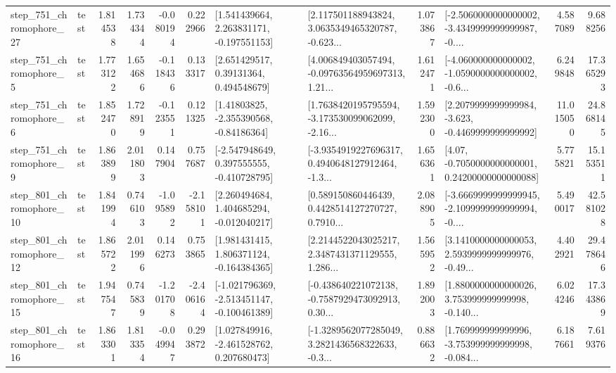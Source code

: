 \begin{tabular}{llrrrrllrlrr}
  step\_751\_chromophore\_27 &      test &      1.814538 &    1.734344 &     -0.080194 &  0.222966 &    [1.541439664, 2.263831171, -0.197551153] &  [2.117501188943824, 3.0635349465320787, -0.623... &       1.073867 &  [-2.5060000000000002, -3.4349999999999987, -0.... &            4.587089 &          9.688256 \\
   step\_751\_chromophore\_5 &      test &      1.773122 &    1.654686 &     -0.118436 &  0.133317 &      [2.651429517, 0.39131364, 0.494548679] &  [4.006849403057494, -0.09763564959697313, 1.21... &       1.612471 &  [-4.060000000000002, -1.0590000000000002, -0.6... &            6.249848 &         17.365293 \\
   step\_751\_chromophore\_6 &      test &      1.852470 &    1.728919 &     -0.123551 &  0.121325 &     [1.41803825, -2.355390568, -0.84186364] &  [1.7638420195795594, -3.173530099062099, -2.16... &       1.592300 &  [2.2079999999999984, -3.623, -0.4469999999999992] &           11.015050 &         24.868145 \\
   step\_751\_chromophore\_9 &      test &      1.863899 &    2.011803 &      0.147904 &  0.757687 &   [-2.547948649, 0.397555555, -0.410728795] &  [-3.9354919227696317, 0.4940648127912464, -1.3... &       1.656361 &   [4.07, -0.7050000000000001, 0.24200000000000088] &            5.775821 &         15.153511 \\
  step\_801\_chromophore\_10 &      test &      1.841994 &    0.746103 &     -1.095892 & -2.158101 &    [2.260494684, 1.404685294, -0.012040217] &  [0.589150860446439, 0.4428514127270727, 0.7910... &       2.088905 &  [-3.6669999999999945, -2.1099999999999994, -0.... &            5.490017 &         42.581028 \\
  step\_801\_chromophore\_12 &      test &      1.865722 &    2.011996 &      0.146273 &  0.753865 &    [1.981431415, 1.806371124, -0.164384365] &  [2.2144522043025217, 2.3487431371129555, 1.286... &       1.565952 &  [3.1410000000000053, 2.5939999999999976, -0.49... &            4.402921 &         29.478646 \\
  step\_801\_chromophore\_15 &      test &      1.947547 &    0.745839 &     -1.201708 & -2.406164 &  [-1.021796369, -2.513451147, -0.100461389] &  [-0.438640221072138, -0.7587929473092913, 0.30... &       1.892003 &  [1.8800000000000026, 3.753999999999998, -0.140... &            6.024246 &         17.343869 \\
  step\_801\_chromophore\_16 &      test &      1.863301 &    1.813354 &     -0.049947 &  0.293872 &    [1.027849916, -2.461528762, 0.207680473] &  [-1.3289562077285049, 3.2821436568322633, -0.3... &       0.886632 &  [1.769999999999996, -3.753999999999998, -0.084... &            6.187661 &          7.619376 \\

\end{tabular}

